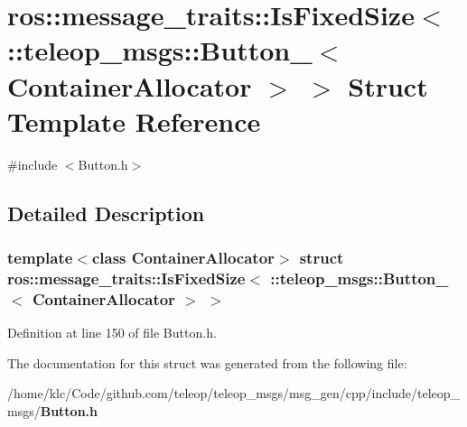 \section{ros::message\_\-traits::IsFixedSize$<$ ::teleop\_\-msgs::Button\_\-$<$ ContainerAllocator $>$ $>$ Struct Template Reference}
\label{structros_1_1message__traits_1_1IsFixedSize_3_01_1_1teleop__msgs_1_1Button___3_01ContainerAllocator_01_4_01_4}


{\ttfamily \#include $<$Button.h$>$}



\subsection{Detailed Description}
\subsubsection*{template$<$class ContainerAllocator$>$ struct ros::message\_\-traits::IsFixedSize$<$ ::teleop\_\-msgs::Button\_\-$<$ ContainerAllocator $>$ $>$}



Definition at line 150 of file Button.h.



The documentation for this struct was generated from the following file:\begin{DoxyCompactItemize}
\item 
/home/klc/Code/github.com/teleop/teleop\_\-msgs/msg\_\-gen/cpp/include/teleop\_\-msgs/{\bf Button.h}\end{DoxyCompactItemize}
